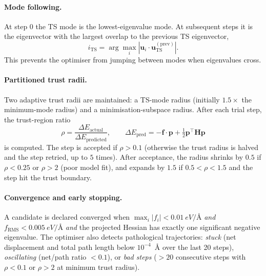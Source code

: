 \paragraph{Mode following.}
At step $0$ the TS mode is the lowest-eigenvalue mode. At subsequent steps it is the eigenvector with the largest overlap to the previous TS eigenvector,
\begin{equation}
    i_\text{TS} = \arg\max_i \left| \mathbf{u}_i \cdot \mathbf{u}_\text{TS}^{(\text{prev})} \right|.
\end{equation}
This prevents the optimiser from jumping between modes when eigenvalues cross.

\paragraph{Partitioned trust radii.}
Two adaptive trust radii are maintained: a TS-mode radius (initially $1.5\times$ the minimum-mode radius) and a minimisation-subspace radius. After each trial step, the trust-region ratio
\begin{equation}
    \rho = \frac{\Delta E_\text{actual}}{\Delta E_\text{predicted}}, \qquad \Delta E_\text{pred} = -\mathbf{f} \cdot \mathbf{p} + \tfrac{1}{2} \mathbf{p}^\top \mathbf{H} \mathbf{p}
\end{equation}
is computed. The step is accepted if $\rho > 0.1$ (otherwise the trust radius is halved and the step retried, up to $5$ times). After acceptance, the radius shrinks by $0.5$ if $\rho < 0.25$ or $\rho > 2$ (poor model fit), and expands by $1.5$ if $0.5 < \rho < 1.5$ and the step hit the trust boundary.

\paragraph{Convergence and early stopping.}
A candidate is declared converged when $\max_i |f_i| < \SI{0.01}{eV/\angstrom}$ \emph{and} $f_\text{RMS} < \SI{0.005}{eV/\angstrom}$ \emph{and} the projected Hessian has exactly one significant negative eigenvalue. The optimiser also detects pathological trajectories: \emph{stuck} (net displacement and total path length below $10^{-4}$~\AA{} over the last 20 steps), \emph{oscillating} (net/path ratio $< 0.1$), or \emph{bad steps} ($>20$ consecutive steps with $\rho < 0.1$ or $\rho > 2$ at minimum trust radius).

